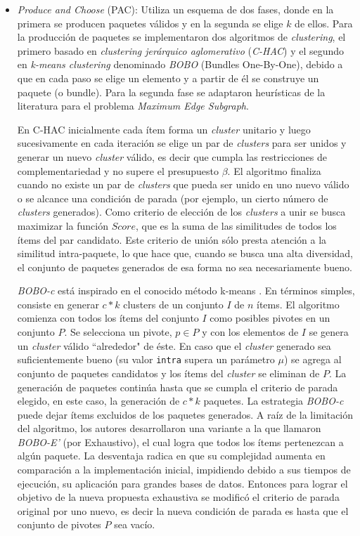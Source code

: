 \begin{itemize}

	\item {\em Produce and Choose} (PAC): Utiliza un esquema de dos fases, donde en la primera se producen paquetes válidos y en la segunda se elige $k$ de ellos. Para la producción de paquetes se implementaron dos algoritmos de {\em clustering}, el primero basado en {\em clustering jerárquico aglomerativo} (\textit{C-HAC}) y el segundo en {\em k-means clustering} denominado \textit{BOBO} (Bundles One-By-One), debido a que en cada paso se elige un elemento y a partir de él se construye un paquete (o bundle). Para la segunda fase se adaptaron heurísticas de la literatura para el problema {\em Maximum Edge Subgraph}.

En C-HAC inicialmente cada ítem forma un {\em cluster} unitario y luego sucesivamente en cada iteración se elige un par de {\em clusters} para ser unidos y generar un nuevo {\em cluster} válido, es decir que cumpla las restricciones de complementariedad y no supere el presupuesto $\beta$. El algoritmo finaliza cuando no existe un par de {\em clusters} que pueda ser unido en uno nuevo válido o se alcance una condición de parada (por ejemplo, un cierto número de {\em clusters} generados). Como criterio de elección de los {\em clusters} a unir se busca maximizar la función $Score$, que es la suma de las similitudes de todos los ítems del par candidato. Este criterio de unión sólo presta atención a la similitud intra-paquete, lo que hace que, cuando se busca una alta diversidad, el conjunto de paquetes generados de esa forma no sea necesariamente bueno.

{\em BOBO-c} está inspirado en el conocido método k-means \cite{forgy65}. En términos simples, consiste en generar $c*k$ clusters de un conjunto $I$ de $n$ ítems. El algoritmo comienza con todos los ítems del conjunto $I$ como posibles pivotes en un conjunto $P$. Se selecciona un pivote, $p \in P$ y con los elementos de $I$ se genera un {\em cluster} válido ``alrededor" de éste. En caso que el {\em cluster} generado sea suficientemente bueno (su valor \texttt{intra} supera un parámetro $\mu$) se agrega al conjunto de paquetes candidatos y los ítems del {\em cluster} se eliminan de $P$. La generación de paquetes continúa hasta que se cumpla el criterio de parada elegido, en este caso, la generación de $c*k$ paquetes. La estrategia \textit{BOBO-c} puede dejar ítems excluidos de los paquetes generados. A raíz de la limitación del algoritmo, los autores desarrollaron una variante a la que llamaron \textit{BOBO-E'} (por Exhaustivo), el cual logra que todos los ítems pertenezcan a algún paquete. La desventaja radica en que su complejidad aumenta en comparación a la implementación inicial, impidiendo debido a sus tiempos de ejecución, su aplicación para grandes bases de datos. Entonces para lograr el objetivo de la nueva propuesta exhaustiva se modificó el criterio de parada original por uno nuevo, es decir la nueva condición de parada es hasta que el conjunto de pivotes $P$ sea vacío.


\end{itemize}
